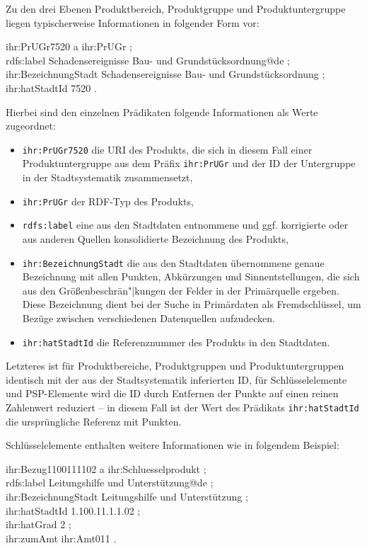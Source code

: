 \documentclass[a4paper,11pt,twoside]{article}
\begin{document}
Zu den drei Ebenen Produktbereich, Produktgruppe und Produktuntergruppe liegen
typischerweise Informationen in folgender Form vor:
\begin{code}
  ihr:PrUGr7520 a ihr:PrUGr ;\+\\
  rdfs:label {\dq}Schadensereignisse Bau- und Grundstücksordnung{\dq}@de ;\\
  ihr:BezeichnungStadt {\dq}Schadensereignisse Bau- und Grundstücksordnung{\dq}
  ;\\ 
  ihr:hatStadtId {\dq}7520{\dq} .
\end{code}

Hierbei sind den einzelnen Prädikaten folgende Informationen als Werte
zugeordnet:
\begin{itemize}
\item \texttt{ihr:PrUGr7520} die URI des Produkts, die sich in diesem Fall
  einer Produktuntergruppe aus dem Präfix \texttt{ihr:PrUGr} und der ID der
  Untergruppe in der Stadtsystematik zusammensetzt,
\item \texttt{ihr:PrUGr} der RDF-Typ des Produkts,
\item \texttt{rdfs:label} eine aus den Stadtdaten entnommene und
  ggf. korrigierte oder aus anderen Quellen konsolidierte Bezeichnung des
  Produkts,
\item \texttt{ihr:BezeichnungStadt} die aus den Stadtdaten übernommene genaue
  Bezeichnung mit allen Punkten, Abkürzungen und Sinnentstellungen, die sich
  aus den Größenbeschrän"|kungen der Felder in der Primärquelle ergeben. Diese
  Bezeichnung dient bei der Suche in Primärdaten als Fremdschlüssel, um Bezüge
  zwischen verschiedenen Datenquellen aufzudecken.
\item \texttt{ihr:hatStadtId} die Referenznummer des Produkts in den Stadtdaten.
\end{itemize}
Letzteres ist für Produktbereiche, Produktgruppen und Produktuntergruppen
identisch mit der aus der Stadtsystematik inferierten ID, für Schlüsselelemente
und PSP-Elemente wird die ID durch Entfernen der Punkte auf einen reinen
Zahlenwert reduziert -- in diesem Fall ist der Wert des Prädikats
\texttt{ihr:hatStadtId} die ursprüngliche Referenz mit Punkten.

Schlüsselelemente enthalten weitere Informationen wie in folgendem Beispiel:
\begin{code}
  ihr:Bezug1100111102 a ihr:Schluesselprodukt ;\+\\
  rdfs:label {\dq}Leitungshilfe und Unterstützung{\dq}@de ;\\
  ihr:BezeichnungStadt {\dq}Leitungshilfe und Unterstützung{\dq} ;\\
  ihr:hatStadtId {\dq}1.100.11.1.1.02{\dq} ;\\
  ihr:hatGrad {\dq}2{\dq} ;\\
  ihr:zumAmt ihr:Amt011 .
\end{code}
\end{document}
